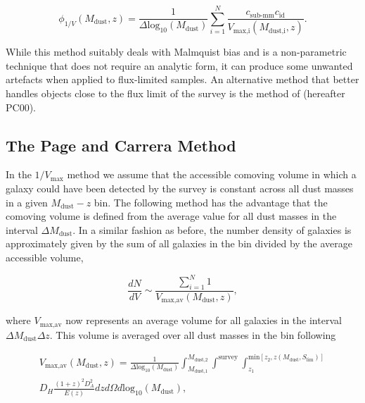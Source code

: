 \begin{equation}
    \phi_{1/V}(M_{\textrm{dust}},z) = \frac{1}{\Delta \textrm{log}_{10}(M_{\textrm{dust}})} \sum_{i=1}^N \frac{c_{\scriptscriptstyle \textrm{sub-mm}} c_{\scriptscriptstyle \textrm{id}}}{V_{\textrm{max,i}}(M_{\textrm{dust,i}},z)}.
\label{eq:phi_1/v_method}
\end{equation}

While this method suitably deals with Malmquist bias and is a non-parametric technique that does not require an analytic form, it can produce some unwanted artefacts when applied to flux-limited samples. An alternative method that better handles objects close to the flux limit of the survey is the method of \citealt{Page_2000} (hereafter PC00).

\subsection{The Page and Carrera Method}

In the $1/V_{\textrm{max}}$ method we assume that the accessible comoving volume in which a galaxy could have been detected by the survey is constant across all dust masses in a given $M_{\textrm{dust}} - z$ bin. The following method has the advantage that the comoving volume is defined from the average value for all dust masses in the interval $\Delta M_{\textrm{dust}}$. In a similar fashion as before, the number density of galaxies is approximately given by the sum of all galaxies in the bin divided by the average accessible volume, 

\begin{equation}
    \frac{dN}{dV} \sim \frac{\sum_{i=1}^N 1}{V_{\textrm{max,av}}(M_{\textrm{dust}},z)},
\label{eq:number_density_pc00_method}
\end{equation}

\noindent where $V_{\textrm{max,av}}$ now represents an average volume for all galaxies in the interval $\Delta M_{\textrm{dust}} \Delta z$. This volume is averaged over all dust masses in the bin following

\begin{multline}
    V_{\textrm{max,av}}(M_{\textrm{dust}},z) = \frac{1}{\Delta \textrm{log}_{10}(M_\textrm{dust})}\int_{\scriptscriptstyle M_{\textrm{dust,1}}}^{\scriptscriptstyle M_{\textrm{dust,2}}} \int^{\scriptscriptstyle \textrm{survey}} \int_{\scriptscriptstyle z_1}^{\scriptscriptstyle \textrm{min}[z_2, z(M_{\textrm{dust}},S_{\textrm{lim}})]} \\ D_H \frac{(1+z)^2 D_A^2}{E(z)} dz d\Omega d\textrm{log}_{10}(M_\textrm{dust}),
\label{eq:volume_pc00_method}
\end{multline}

